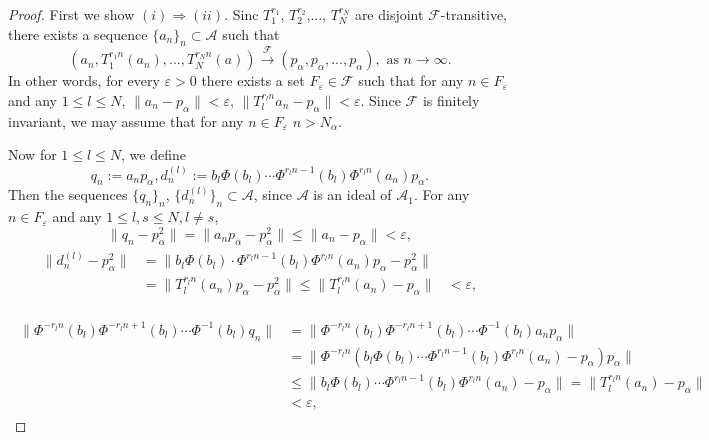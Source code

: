 \documentclass{article}
\begin{document}
\begin{proof}
First we show $(i)\Rightarrow(ii)$. Sinc $T^{r_{1}}_{1}$, $T^{r_{2}}_{2}$,..., $T^{r_{N}}_{N}$ are disjoint $\mathcal{F}$-transitive, there exists a sequence $\{a_{n}\}_{n}\subset \mathcal{A}$ such that 
\[(a_{n}, T^{r_{1}n}_{1}(a_{n}),..., T^{r_{N}n}_{N}(a))\stackrel{\mathcal F}{\longrightarrow} (p_{\alpha}, p_{\alpha},..., p_{\alpha}), \textrm{ as } n\rightarrow \infty.\]
In other words, for every $\varepsilon>0$ there exists a set $F_{\varepsilon}\in \mathcal{F}$ such that for any $n\in F_{\varepsilon}$ and any $1\leq l\leq N$, $\|a_{n}-p_{\alpha}\|<\varepsilon$, $\|T^{r_{l}n}_{l}a_{n}-p_{\alpha}\|<\varepsilon$.
Since $\mathcal{F}$ is finitely invariant, we may assume that for any $n\in F_{\varepsilon}$ $n>N_{\alpha}$. 

Now for $1\leq l\leq N$, we define 
\[q_{n}:=a_{n}p_{\alpha}, d^{(l)}_{n}:=b_{l}\Phi(b_{l})\cdots\Phi^{r_{l}n-1}(b_{l})\Phi^{r_{l}n}(a_{n})p_{\alpha}.\]
Then the sequences $\{q_{n}\}_{n}$, $\{d^{(l)}_{n}\}_{n}\subset \mathcal{A}$, since $\mathcal{A}$ is an ideal of $\mathcal{A}_{1}$. For any $n\in F_{\varepsilon}$ and any $1\leq l, s\leq N, l\neq s$,
\[\|q_{n}-p^{2}_{\alpha}\|=\|a_{n}p_{\alpha}-p^{2}_{\alpha}\|\leq \|a_{n}-p_{\alpha}\|<\varepsilon,\]
\begin{eqnarray}\begin{split}\nonumber
\|d^{(l)}_{n}-p^{2}_{\alpha}\|&=\|b_{l}\Phi(b_{l})\cdot\Phi^{r_{l}n-1}(b_{l})\Phi^{r_{l}n}(a_{n})p_{\alpha}-p^{2}_{\alpha}\|
\\
&=\|T^{r_{l}n}_{l}(a_{n})p_{\alpha}-p^{2}_{\alpha}\|\leq \|T^{r_{l}n}_{l}(a_{n})-p_{\alpha}\|
&<\varepsilon,
\end{split}
\end{eqnarray}

\begin{eqnarray}\begin{split}\nonumber
\|\Phi^{-r_{l}n}(b_{l})\Phi^{-r_{l}n+1}(b_{l})\cdots \Phi^{-1}(b_{l})q_{n}\|&=\|\Phi^{-r_{l}n}(b_{l})\Phi^{-r_{l}n+1}(b_{l})\cdots \Phi^{-1}(b_{l})a_{n}p_{\alpha}\|
\\
&=\|\Phi^{-r_{l}n}(b_{l}\Phi(b_{l})\cdots \Phi^{r_{l}n-1}(b_{l})\Phi^{r_{l}n}(a_{n})-p_{\alpha})p_{\alpha}\|
\\
&\leq \|b_{l}\Phi(b_{l})\cdots \Phi^{r_{l}n-1}(b_{l})\Phi^{r_{l}n}(a_{n})-p_{\alpha}\|=\|T^{r_{l}n}_{l}(a_{n})-p_{\alpha}\|
\\
&<\varepsilon,
\end{split}
\end{eqnarray}


\end{proof}
\end{document}
